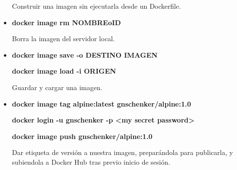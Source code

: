 \documentclass[12pt, twoside, openright]{report} %
\begin{document}
\begin{itemize}
	      Construir una imagen sin ejecutarla desde un Dockerfile.

	\item \textbf{docker image rm NOMBREoID}

	      Borra la imagen del servidor local.

	\item \textbf{docker image save -o DESTINO IMAGEN}

	      \textbf{docker image load -i ORIGEN}

	      Guardar y cargar una imagen.

	\item \textbf{docker image tag alpine:latest gnschenker/alpine:1.0}

	      \textbf{docker login -u gnschenker -p <my secret password>}

	      \textbf{docker image push gnschenker/alpine:1.0}

	      Dar etiqueta de versión a nuestra imagen, preparándola para publicarla, y subiendola a Docker Hub tras previo inicio de sesión.
\end{itemize}
\pagebreak
\end{document}
